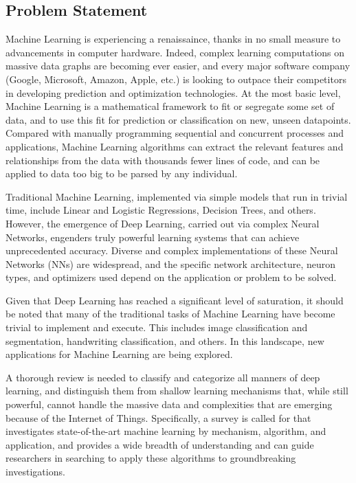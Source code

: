\documentclass[12pt]{article}
\begin{document}
	\subsection{Problem Statement}\hspace{4ex}Machine Learning is experiencing a renaissaince, thanks in no small measure to advancements in computer hardware. Indeed, complex learning computations on massive data graphs are becoming ever easier, and every major software company (Google, Microsoft, Amazon, Apple, etc.) is looking to outpace their competitors in developing prediction and optimization technologies. At the most basic level, Machine Learning is a mathematical framework to fit or segregate some set of data, and to use this fit for prediction or classification on new, unseen datapoints. Compared with manually programming sequential and concurrent processes and applications, Machine Learning algorithms can extract the relevant features and relationships from the data with thousands fewer lines of code, and can be applied to data too big to be parsed by any individual. 
	
	Traditional Machine Learning, implemented via simple models that run in trivial time, include Linear and Logistic Regressions, Decision Trees, and others. However, the emergence of Deep Learning, carried out via complex Neural Networks, engenders truly powerful learning systems that can achieve unprecedented accuracy. Diverse and complex implementations of these Neural Networks (NNs) are widespread, and the specific network architecture, neuron types, and optimizers used depend on the application or problem to be solved.  
	
	Given that Deep Learning has reached a significant level of saturation, it should be noted that many of the traditional tasks of Machine Learning have become trivial to implement and execute. This includes image classification and segmentation, handwriting classification, and others. In this landscape, new applications for Machine Learning are being explored. 
	
	A thorough review is needed to classify and categorize all manners of deep learning, and distinguish them from shallow learning mechanisms that, while still powerful, cannot handle the massive data and complexities that are emerging because of the Internet of Things. Specifically, a survey is called for that investigates state-of-the-art machine learning by mechanism, algorithm, and application, and provides a wide breadth of understanding and can guide researchers in searching to apply these algorithms to groundbreaking investigations.
	
\end{document}

